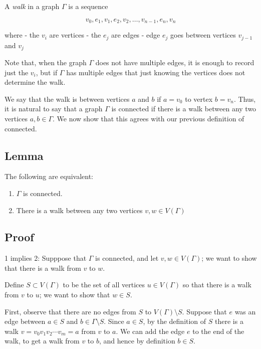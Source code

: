\documentclass[]{article}
\providecommand{\tightlist}{%
  \setlength{\itemsep}{0pt}\setlength{\parskip}{0pt}}
\begin{document}
A \emph{walk} in a graph \(\Gamma\) is a sequence

\[v_0, e_1, v_1,e_2, v_2,\dots, v_{n-1}, e_n, v_n\]

where - the \(v_i\) are vertices - the \(e_j\) are edges - edge \(e_j\)
goes between vertices \(v_{j-1}\) and \(v_j\)

Note that, when the graph \(\Gamma\) does not have multiple edges, it is
enough to record just the \(v_i\), but if \(\Gamma\) has multiple edges
that just knowing the vertices does not determine the walk.

We say that the walk is between vertices \(a\) and \(b\) if \(a=v_0\) to
vertex \(b=v_n\). Thus, it is natural to say that a graph \(\Gamma\) is
connected if there is a walk between any two vertices \(a,b\in\Gamma\).
We now show that this agrees with our previous definition of connected.

\subsection{Lemma}\label{lemma}

The following are equivalent:

\begin{enumerate}
\def\labelenumi{\arabic{enumi}.}
\tightlist
\item
  \(\Gamma\) is connected.
\item
  There is a walk between any two vertices \(v, w\in V(\Gamma)\)
\end{enumerate}

\subsection{Proof}\label{proof-1}

1 implies 2: Supppose that \(\Gamma\) is connected, and let
\(v, w\in V(\Gamma)\); we want to show that there is a walk from \(v\)
to \(w\).

Define \(S\subset V(\Gamma)\) to be the set of all vertices
\(u\in V(\Gamma)\) so that there is a walk from \(v\) to \(u\); we want
to show that \(w\in S\).

First, observe that there are no edges from \(S\) to
\(V(\Gamma)\setminus S\). Suppose that \(e\) was an edge between
\(a\in S\) and \(b\in\Gamma\setminus S\). Since \(a\in S\), by the
definition of \(S\) there is a walk \(v=v_0v_1v_2\cdots v_m=a\) from
\(v\) to \(a\). We can add the edge \(e\) to the end of the walk, to get
a walk from \(v\) to \(b\), and hence by definition \(b\in S\).
\end{document}
